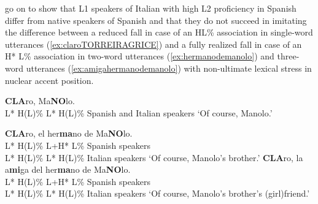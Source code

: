 \citet{TorreiraGrice.2018} go on to show that L1 speakers of Italian with high L2 proficiency in Spanish differ from native speakers of Spanish and that they do not succeed in imitating the difference between a reduced fall in case of an HL\% association in single-word utterances (\ref{ex:claroTORREIRAGRICE}) and a fully realized fall in case of an H* L\% association in two-word utterances (\ref{ex:hermanodemanolo}) and three-word utterances (\ref{ex:amigahermanodemanolo}) with non-ultimate lexical stress in nuclear accent position.

\begin{exe}
	\ex \label{ex:claroTORREIRAGRICE}
	\textbf{CLA}ro, Ma\textbf{NO}lo. \\
	\hspace*{1em}L* H(L)\% \hspace*{0.2em} L* H(L)\% \hfill Spanish and Italian speakers
	\glt `Of course, Manolo.'

\ex \label{ex:hermanodemanolo}
	\textbf{CLA}ro, el her\textbf{ma}no de Ma\textbf{NO}lo. \\
	\hspace*{1em}L* H(L)\%\hspace*{5.2em} L+H* L\% \hfill Spanish speakers \\
        \hspace*{1em}L* H(L)\%\hspace*{6.5em} L* H(L)\% \hfill Italian speakers 
	\glt `Of course, Manolo's brother.'  
\pagebreak
\ex \label{ex:amigahermanodemanolo}
	\textbf{CLA}ro, la a\textbf{mi}ga del her\textbf{ma}no de Ma\textbf{NO}lo. \\
	\hspace*{1em}L* H(L)\%\hspace*{9.4em} L+H* L\% \hfill Spanish speakers \\
        \hspace*{1em}L* H(L)\%\hspace*{10.5em} L* H(L)\% \hfill Italian speakers 
	\glt `Of course, Manolo's brother's (girl)friend.' 
\end{exe}

